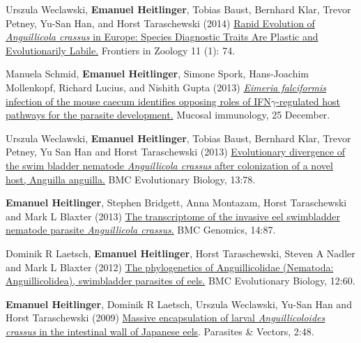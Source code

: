 \documentclass[10pt,a4paper]{article}
\renewenvironment{itemize}{
  \begin{list}{}{
    \setlength{\leftmargin}{2.5em}
    \setlength{\itemsep}{0.25em}
    \setlength{\parskip}{0pt}
    \setlength{\parsep}{0.25em}
  }
}{
  \end{list}
}
\begin{document}
\begin{itemize}
\item Urszula Weclawski, \textbf{Emanuel Heitlinger}, Tobias Baust,
  Bernhard Klar, Trevor Petney, Yu-San Han, and Horst Taraschewski
  (2014) \href{http://www.frontiersinzoology.com/content/11/1/74}{
    Rapid Evolution of \textit{Anguillicola crassus} in Europe: Species
    Diagnostic Traits Are Plastic and Evolutionarily Labile.}
  Frontiers in Zoology 11 (1): 74.

\item Manuela Schmid, \textbf{Emanuel Heitlinger}, Simone Spork, Hans-Joachim
  Mollenkopf, Richard Lucius, and Nishith Gupta (2013)
  \href{http://www.nature.com/mi/journal/vaop/ncurrent/full/mi2013115a.html}
  {\textit{Eimeria falciformis} infection of the mouse caecum identifies
    opposing roles of IFN$\gamma$-regulated host pathways for the parasite
    development.} Mucosal immunology, 25 December.

\item Urszula Weclawski, \textbf{Emanuel Heitlinger}, Tobias Baust,
  Bernhard Klar, Trevor Petney, Yu San Han and Horst Taraschewski
  (2013) 
  \href{http://www.biomedcentral.com/1471-2148/13/78}{
    Evolutionary divergence of the swim bladder nematode
    \textit{Anguillicola crassus} after colonization of a novel host,
    Anguilla anguilla.} BMC Evolutionary Biology,
  13:78.

\item \textbf{Emanuel Heitlinger}, Stephen Bridgett, Anna Montazam,
  Horst Taraschewski and Mark L Blaxter (2013)
  \href{http://www.biomedcentral.com/1471-2164/14/87}{The
    transcriptome of the invasive eel swimbladder nematode parasite
    \textit{Anguillicola crassus}.} BMC Genomics, 
  14:87.

\item Dominik R Laetsch, \textbf{Emanuel Heitlinger}, Horst
  Taraschewski, Steven A Nadler and Mark L Blaxter (2012)
  \href{http://www.biomedcentral.com/1471-2148/12/60} {The
    phylogenetics of Anguillicolidae (Nematoda: Anguillicolidea),
    swimbladder parasites of eels.} BMC Evolutionary Biology,
  12:60.

\item \textbf{Emanuel Heitlinger}, Dominik R Laetsch, Urszula
  Weclawski, Yu-San Han and Horst Taraschewski (2009)
  \href{http://www.parasitesandvectors.com/content/2/1/48}{Massive
    encapsulation of larval \textit{Anguillicoloides crassus} in the
    intestinal wall of Japanese eels}. Parasites \& Vectors,
  2:48.
\end{itemize}
\end{document}
